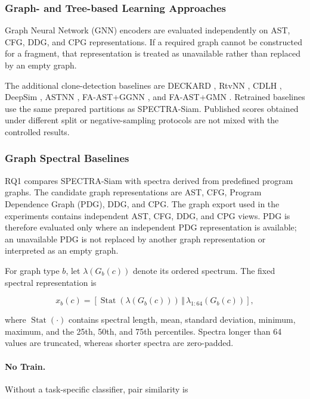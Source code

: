 \documentclass[authoryear,final,5p,times,twocolumn]{elsarticle}
\theoremstyle{plain}
\begin{document}
\subsubsection{Graph- and Tree-based Learning Approaches}
\label{sec:graph-based_baselines}

Graph Neural Network (GNN) encoders are evaluated independently on AST, CFG,
DDG, and CPG representations. If a required graph cannot be constructed for a
fragment, that representation is treated as unavailable rather than replaced
by an empty graph.

The additional clone-detection baselines are DECKARD \cite{??},
RtvNN \cite{??}, CDLH \cite{??}, DeepSim \cite{??}, ASTNN \cite{??},
FA-AST+GGNN \cite{??}, and FA-AST+GMN \cite{??}. Retrained baselines use the
same prepared partitions as SPECTRA-Siam. Published scores obtained under
different split or negative-sampling protocols are not mixed with the
controlled results.


\subsubsection{Graph Spectral Baselines}
\label{sec:spectral_baselines}

RQ1 compares SPECTRA-Siam with spectra derived from predefined program graphs.
The candidate graph representations are AST, CFG, Program Dependence Graph
(PDG), DDG, and CPG. The graph export used in the experiments contains
independent AST, CFG, DDG, and CPG views. PDG is therefore evaluated only
where an independent PDG representation is available; an unavailable PDG is
not replaced by another graph representation or interpreted as an empty
graph.

For graph type $b$, let $\lambda(G_b(c))$ denote its ordered spectrum. The
fixed spectral representation is

\begin{equation}
\label{eq:fixed_spectral_vector}
x_b(c)
=
\left[
    \operatorname{Stat}
    \left(
        \lambda(G_b(c))
    \right)
    \,\Vert\,
    \lambda_{1:64}(G_b(c))
\right],
\end{equation}

where $\operatorname{Stat}(\cdot)$ contains spectral length, mean, standard
deviation, minimum, maximum, and the 25th, 50th, and 75th percentiles.
Spectra longer than 64 values are truncated, whereas shorter spectra are
zero-padded.

\paragraph{No Train.}
Without a task-specific classifier, pair similarity is
\end{document}
